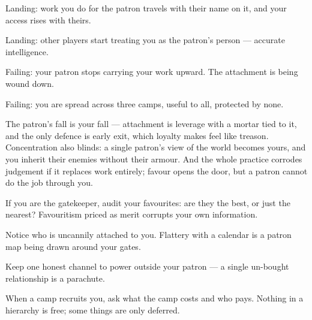 \begin{feedback}
  \item Landing: work you do for the patron travels with their name on it, and your access rises with theirs.
  \item Landing: other players start treating you as the patron's person --- accurate intelligence.
  \item Failing: your patron stops carrying your work upward. The attachment is being wound down.
  \item Failing: you are spread across three camps, useful to all, protected by none.
\end{feedback}
\begin{failure}
The patron's fall is your fall --- attachment is leverage with a mortar tied to it, and the only defence is early exit, which loyalty makes feel like treason. Concentration also blinds: a single patron's view of the world becomes yours, and you inherit their enemies without their armour. And the whole practice corrodes judgement if it replaces work entirely; favour opens the door, but a patron cannot do the job through you.
\end{failure}
\begin{countermeasures}
  \item If you are the gatekeeper, audit your favourites: are they the best, or just the nearest? Favouritism priced as merit corrupts your own information.
  \item Notice who is uncannily attached to you. Flattery with a calendar is a patron map being drawn around your gates.
  \item Keep one honest channel to power outside your patron --- a single un-bought relationship is a parachute.
  \item When a camp recruits you, ask what the camp costs and who pays. Nothing in a hierarchy is free; some things are only deferred.
\end{countermeasures}

\seesources
{}
